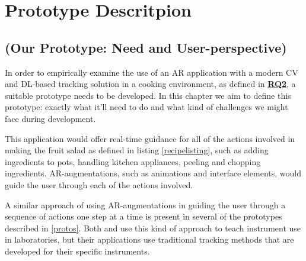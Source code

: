 \chapter{Prototype Descritpion} \label{ourProto}

\section{(Our Prototype: Need and User-perspective)} \label{nUPers}


In order to empirically examine the use of an AR application with a modern CV 
and DL-based tracking solution in a cooking environment, as defined in 
\hyperref[rq2]{\textbf{RQ2}}, a suitable prototype needs to be developed. In 
this chapter we aim to define this prototype: exactly what it'll need to do and 
what kind of challenges we might face during development. \par





	This application would offer real-time guidance for all of the actions 
involved in making the fruit salad as defined in listing \ref{recipelisting}, 
such as adding ingredients to pots, handling kitchen appliances, peeling and 
chopping ingredients. AR-augmentations, such as animations and interface 
elements, would guide the user through each of the actions involved. \par
	A similar approach of using AR-augmentations in guiding the user 
through a sequence of actions one step at a time is present in several of the 
prototypes described in \ref{protos}. Both \textcite{pylvanainen} and 
\textcite{reyesEtAl2016} use this kind of approach to teach instrument use in 
laboratories, but their applications use traditional tracking methods that 
are developed for their specific instruments.



